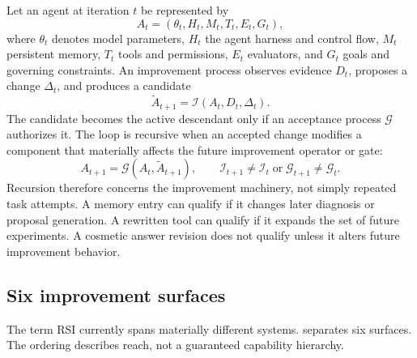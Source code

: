 \documentclass[11pt,a4paper]{article}
\begin{document}
Let an agent at iteration $t$ be represented by
\begin{equation}
  A_t = (\theta_t, H_t, M_t, T_t, E_t, G_t),
\end{equation}
where $\theta_t$ denotes model parameters, $H_t$ the agent harness and control flow, $M_t$ persistent memory, $T_t$ tools and permissions, $E_t$ evaluators, and $G_t$ goals and governing constraints. An improvement process observes evidence $D_t$, proposes a change $\Delta_t$, and produces a candidate
\begin{equation}
  \widetilde{A}_{t+1}=\mathcal{I}(A_t,D_t,\Delta_t).
\end{equation}
The candidate becomes the active descendant only if an acceptance process $\mathcal{G}$ authorizes it. The loop is recursive when an accepted change modifies a component that materially affects the future improvement operator or gate:
\begin{equation}
  A_{t+1}=\mathcal{G}(A_t,\widetilde{A}_{t+1}), \qquad
  \mathcal{I}_{t+1}\neq\mathcal{I}_{t}\;\text{or}\;\mathcal{G}_{t+1}\neq\mathcal{G}_{t}.
\end{equation}
Recursion therefore concerns the improvement machinery, not simply repeated task attempts. A memory entry can qualify if it changes later diagnosis or proposal generation. A rewritten tool can qualify if it expands the set of future experiments. A cosmetic answer revision does not qualify unless it alters future improvement behavior.

\subsection{Six improvement surfaces}

The term RSI currently spans materially different systems.  separates six surfaces. The ordering describes reach, not a guaranteed capability hierarchy.
\end{document}
